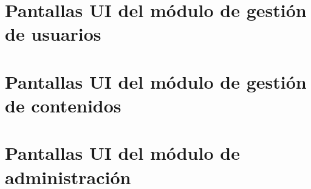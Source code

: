 \section{Pantallas UI del módulo de gestión de usuarios}





















\clearpage
\section{Pantallas UI del módulo de gestión de contenidos}











\clearpage
\section{Pantallas UI del módulo de administración}






\clearpage
